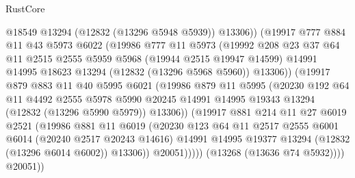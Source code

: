 \begin{lexlean}{RustCore}
\begin{coremodule}
                    @18549
                    @13294
                    (@12832 (@13296 @5948 @5939))
                    @13306))
                (@19917
                  @777
                  @884
                  @11
                  @43
                  @5973
                  @6022
                  (@19986
                    @777
                    @11
                    @5973
                    (@19992
                      @208
                      @23
                      @37
                      @64
                      @11
                      @2515
                      @2555
                      @5959
                      @5968
                      (@19944 @2515 @19947 @14599)
                      @14991
                      @14995
                      @18623
                      @13294
                      (@12832 (@13296 @5968 @5960))
                      @13306))
                  (@19917
                    @879
                    @883
                    @11
                    @40
                    @5995
                    @6021
                    (@19986
                      @879
                      @11
                      @5995
                      (@20230
                        @192
                        @64
                        @11
                        @4492
                        @2555
                        @5978
                        @5990
                        @20245
                        @14991
                        @14995
                        @19343
                        @13294
                        (@12832 (@13296 @5990 @5979))
                        @13306))
                    (@19917
                      @881
                      @214
                      @11
                      @27
                      @6019
                      @2521
                      (@19986
                        @881
                        @11
                        @6019
                        (@20230
                          @123
                          @64
                          @11
                          @2517
                          @2555
                          @6001
                          @6014
                          (@20240 @2517 @20243 @14616)
                          @14991
                          @14995
                          @19377
                          @13294
                          (@12832 (@13296 @6014 @6002))
                          @13306))
                      @20051)))))
            (@13268 (@13636 @74 @5932))))
        @20051))

\end{coremodule}
\end{lexlean}
